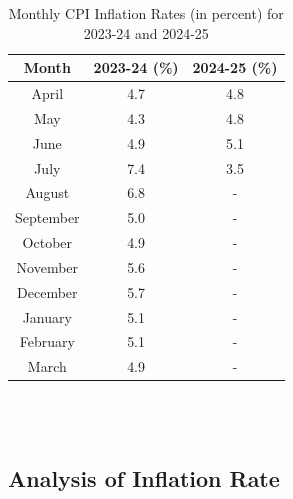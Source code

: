 \documentclass[a4paper,12pt]{extarticle} %
\begin{document}
\begin{table}[h!]
\centering
\begin{tabular}{|c|c|c|}
    \hline
    \textbf{Month} & \textbf{2023-24 (\%)} & \textbf{2024-25 (\%)} \\
    \hline
    April   & 4.7 & 4.8 \\
    May     & 4.3 & 4.8 \\
    June    & 4.9 & 5.1 \\
    July    & 7.4 & 3.5 \\
    August  & 6.8 & -   \\
    September & 5.0 & - \\
    October & 4.9 & - \\
    November & 5.6 & - \\
    December & 5.7 & - \\
    January & 5.1 & - \\
    February & 5.1 & - \\
    March   & 4.9 & - \\
    \hline
\end{tabular}
\caption{Monthly CPI Inflation Rates (in percent) for 2023-24 and 2024-25}
\label{table:inflation_rates}
\end{table}\\
\\
\subsection{Analysis of Inflation Rate}
\end{document}
